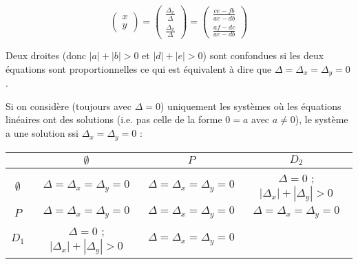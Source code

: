 \documentclass[a4paper,10pt]{report}
\begin{document}
\begin{displaymath}
\begin{pmatrix}
	x \\ y
\end{pmatrix}
=	
\begin{pmatrix}
	\frac{\Delta_x}{\Delta} \\
	\frac{\Delta_x}{\Delta}
\end{pmatrix}
=
\begin{pmatrix}
	\frac{ce-fb}{ae-db} \\
	\frac{af-dc}{ae-db}
\end{pmatrix}
\end{displaymath}

Deux droites (donc $|a|+|b| >0$ et $|d|+|e| >0$) sont confondues si les deux équations sont proportionnelles ce qui est équivalent à dire que
$\Delta=\Delta_x = \Delta_y = 0$.

Si on considère (toujours avec $\Delta = 0$) uniquement les systèmes où les équations linéaires ont des solutions 
(i.e. pas celle de la forme $0=a$ avec $a\neq 0$), le système a une solution ssi $\Delta_x = \Delta_y = 0$ :

\begin{tabular}{|c|c|c|c|}
	\hline
	\diagbox{$S_1$}{$S_2$}& $\emptyset$                             & $P$                           & $D_2$                            \\
	\hline
	$\emptyset$           & $\Delta=\Delta_x=\Delta_y=0$           & $\Delta=\Delta_x=\Delta_y=0$  & $\Delta=0$ ; $|\Delta_x|+|\Delta_y| >0$ \\
	\hline
	$P$                   & $\Delta=\Delta_x=\Delta_y=0$           & $\Delta=\Delta_x=\Delta_y=0$  & $\Delta=\Delta_x=\Delta_y=0$   \\
	\hline
	$D_1$                 & $\Delta=0$ ; $|\Delta_x|+|\Delta_y| >0$ & $\Delta=\Delta_x=\Delta_y=0$ &                                \\
	\hline
\end{tabular}
 
\end{document}
